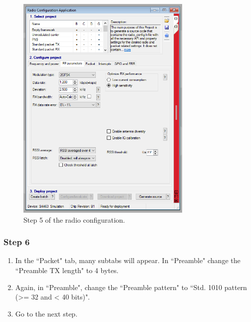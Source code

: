 \begin{figure}[!h]
	\begin{center}
		\includegraphics[width=0.75\textwidth]{figures/wds-tutorial/wds-tutorial-5.png}
		\caption{Step 5 of the radio configuration.}
		\label{fig:wds-tutorial-step-5}
	\end{center}
\end{figure}

\subsubsection{Step 6}

\begin{enumerate}
    \item In the ``Packet" tab, many subtabs will appear. In ``Preamble" change the ``Preamble TX length" to 4 bytes.
    \item Again, in ``Preamble", change the ``Preamble pattern" to ``Std. 1010 pattern (>= 32 and < 40 bits)".
    \item Go to the next step.
\end{enumerate}

